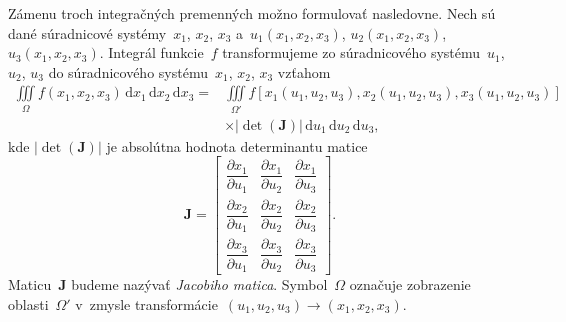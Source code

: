 \documentclass[a4paper, 12pt]{book}
\newcommand{\diff}{\mathrm d}
\let\vec\mathbf
\begin{document}
Zámenu troch integračných premenných možno formulovať nasledovne.  Nech sú dané 
súradnicové systémy~$x_1$, $x_2$, $x_3$ a~$u_1(x_1, x_2, x_3)$, $u_2(x_1, x_2, 
x_3)$, $u_3(x_1, x_2, x_3)$.  Integrál funkcie~$f$ transformujeme zo 
súradnicového systému~$u_1$, $u_2$, $u_3$ do súradnicového systému~$x_1$, 
$x_2$, $x_3$ vzťahom \parencite[napríklad][]{Arfken2005,Olver2010}
%
\begin{equation}
\label{eq:iiint_change_of_variable}
\begin{split}
\iiint\limits_{\Omega} f(x_1, x_2, x_3) \, \diff x_1 \, \diff x_2 \, \diff x_3 
 =& \iiint\limits_{\Omega'} f[x_1(u_1, u_2, u_3), x_2(u_1, u_2, u_3), x_3(u_1, 
 u_2, u_3)] \\
& \times | \det(\mathbf{J}) | \, \diff u_1 \, \diff u_2 \, \diff u_3{,}
\end{split}
\end{equation}
%
kde $| \det(\mathbf{J}) |$ je absolútna hodnota determinantu matice
%
\begin{equation}
\label{eq:jacobi}
\mathbf{J} = 
\begin{bmatrix}
\dfrac{\partial x_1}{\partial{u_1}} & \dfrac{\partial x_1}{\partial{u_2}} 
& \dfrac{\partial x_1}{\partial{u_3}}\\[2ex]
%
\dfrac{\partial x_2}{\partial{u_1}} & \dfrac{\partial x_2}{\partial{u_2}} 
& \dfrac{\partial x_2}{\partial{u_3}}\\[2ex]
%
\dfrac{\partial x_3}{\partial{u_1}} & \dfrac{\partial x_3}{\partial{u_2}} 
& \dfrac{\partial x_3}{\partial{u_3}}
\end{bmatrix}
%
{.}
\end{equation}
%
Maticu~$\vec J$ budeme nazývať \emph{Jacobiho matica}.  Symbol~$\Omega$ 
označuje zobrazenie oblasti~$\Omega'$ v~zmysle transformácie~$(u_1, u_2, u_3) 
\rightarrow (x_1, x_2, x_3)$.
\end{document}
